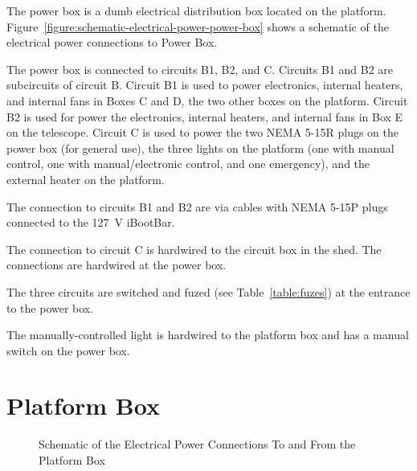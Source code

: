 The power box is a dumb electrical distribution box located on the platform.  Figure~\ref{figure:schematic-electrical-power-power-box} shows a schematic of the electrical power connections to Power Box.

The power box is connected to circuits B1, B2, and C. Circuits B1 and B2 are subcircuits of circuit B. Circuit B1 is used to power electronics, internal heaters, and internal fans in Boxes C and D, the two other boxes on the platform. Circuit B2 is used for power the electronics, internal heaters, and internal fans in Box E on the telescope. Circuit C is used to power the two NEMA 5-15R plugs on the power box (for general use), the three lights on the platform (one with manual control, one with manual/electronic control, and one emergency), and the external heater on the platform.

The connection to circuits B1 and B2 are via cables with NEMA 5-15P plugs connected to the 127~V iBootBar. 

The connection to circuit C is hardwired to the circuit box in the shed. The connections are hardwired at the power box.

The three circuits are switched and fuzed (see Table~\ref{table:fuzes}) at the entrance to the power box.

The manually-controlled light is hardwired to the platform box and has a manual switch on the power box.

\section{Platform Box}

\begin{figure}
\begin{center}
\footnotesize 
{}
\end{center}
\caption{Schematic of the Electrical Power Connections To and From the Platform Box}
\label{figure:schematic-electrical-power-platform-box}
\end{figure}

